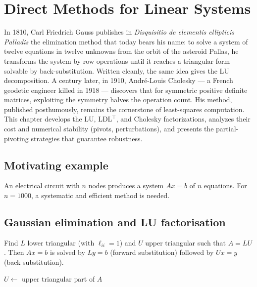 \chapter{Direct Methods for Linear Systems}
\label{ch:direct}

In 1810, Carl Friedrich Gauss publishes in \emph{Disquisitio de elementis ellipticis Palladis} the elimination method that today bears his name: to solve a system of twelve equations in twelve unknowns from the orbit of the asteroid Pallas, he transforms the system by row operations until it reaches a triangular form solvable by back-substitution. Written cleanly, the same idea gives the LU decomposition. A century later, in 1910, André-Louis Cholesky --- a French geodetic engineer killed in 1918 --- discovers that for symmetric positive definite matrices, exploiting the symmetry halves the operation count. His method, published posthumously, remains the cornerstone of least-squares computation. This chapter develops the LU, LDL$^\top$, and Cholesky factorizations, analyzes their cost and numerical stability (pivots, perturbations), and presents the partial-pivoting strategies that guarantee robustness.

\section{Motivating example}
An electrical circuit with $n$ nodes produces a system $Ax=b$ of $n$ equations. For $n=1000$, a systematic and efficient method is needed.

\section{Gaussian elimination and LU factorisation}

\begin{definition}[LU factorisation]
Find $L$ lower triangular (with $\ell_{ii}=1$) and $U$ upper triangular such that $A=LU$. Then $Ax=b$ is solved by $Ly=b$ (forward substitution) followed by $Ux=y$ (back substitution).
\end{definition}

\begin{algorithm}[H]
\caption{LU factorisation (without pivoting)}\label{alg:lu}
$U \gets$ upper triangular part of $A$\;
\end{algorithm}

